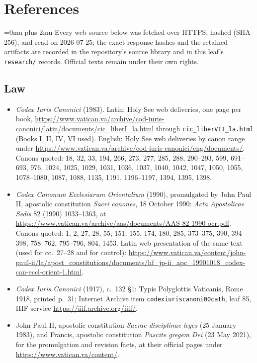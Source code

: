 \section{References}
\begingroup
\RaggedRight
\sloppy
\setlength{\emergencystretch}{4em}
\Urlmuskip=0mu plus 2mu\relax
\footnotesize
Every web source below was fetched over HTTPS, hashed (SHA-256), and read on 2026-07-25; the exact response hashes and the retained artifacts are recorded in the repository's source library and in this leaf's \texttt{research/} records. Official texts remain under their own rights.

\subsection*{Law}

\begin{itemize}
\item \emph{Codex Iuris Canonici} (1983). Latin: Holy See web deliveries, one page per book, \url{https://www.vatican.va/archive/cod-iuris-canonici/latin/documents/cic_liberI_la.html} through \texttt{cic\_liberVII\_la.html} (Books I, II, IV, VI used). English: Holy See web deliveries by canon range under \url{https://www.vatican.va/archive/cod-iuris-canonici/eng/documents/}. Canons quoted: 18, 32, 33, 194, 266, 273, 277, 285, 288, 290--293, 599, 691--693, 976, 1024, 1025, 1029, 1031, 1036, 1037, 1040, 1042, 1047, 1050, 1055, 1078--1080, 1087, 1088, 1135, 1191, 1196--1197, 1394, 1395, 1398.
\item \emph{Codex Canonum Ecclesiarum Orientalium} (1990), promulgated by John Paul II, apostolic constitution \emph{Sacri canones}, 18 October 1990: \emph{Acta Apostolicae Sedis} 82 (1990) 1033--1363, at \url{https://www.vatican.va/archive/aas/documents/AAS-82-1990-ocr.pdf}. Canons quoted: 1, 2, 27, 28, 55, 151, 155, 174, 180, 285, 373--375, 390, 394--398, 758--762, 795--796, 804, 1453. Latin web presentation of the same text (used for cc.~27--28 and for control): \url{https://www.vatican.va/content/john-paul-ii/la/apost_constitutions/documents/hf_jp-ii_apc_19901018_codex-can-eccl-orient-1.html}.
\item \emph{Codex Iuris Canonici} (1917), c.~132 §1: Typis Polyglottis Vaticanis, Rome 1918, printed p.~31; Internet Archive item \texttt{codexiuriscanoni00cath}, leaf 85, IIIF service \url{https://iiif.archive.org/iiif/}.
\item John Paul II, apostolic constitution \emph{Sacrae disciplinae leges} (25 January 1983), and Francis, apostolic constitution \emph{Pascite gregem Dei} (23 May 2021), for the promulgation and revision facts, at their official pages under \url{https://www.vatican.va/content/}.

\end{itemize}
